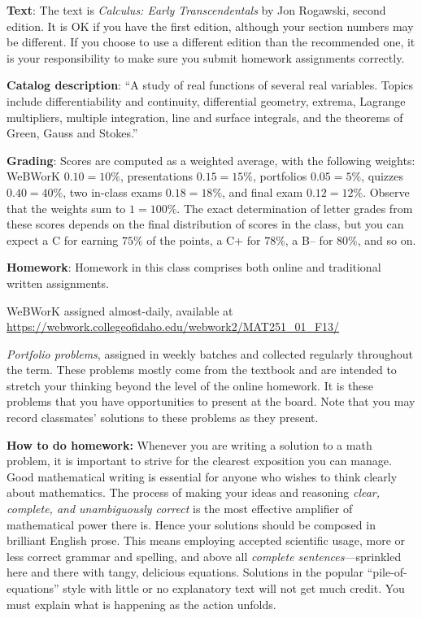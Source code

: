 \documentclass[12pt,twoside]{amsart}
\begin{document}
\textbf{Text}: The text is \emph{Calculus: Early Transcendentals} by Jon Rogawski, second edition. It is OK if you have the first edition, although your section numbers may be different. If you choose to use a different edition than the recommended one, it is your responsibility to make sure you submit homework assignments correctly. 

\textbf{Catalog description}: ``A study of real functions of several real variables. Topics include differentiability and continuity, differential geometry, extrema, Lagrange multipliers, multiple integration, line and surface integrals, and the theorems of Green, Gauss and Stokes.''

\textbf{Grading}: Scores are computed as a weighted average, with the following weights: WeBWorK $0.10 = 10\%$, presentations $0.15 = 15\%$, portfolios $0.05 = 5\%$, quizzes $0.40 = 40\%$, two in-class exams $0.18 = 18\%$, and final exam $0.12 = 12\%$. Observe that the weights sum to $1 = 100\%$. The exact determination of letter grades from these scores depends on the final distribution of scores in the class, but you can expect a C for earning $75\%$ of the points, a C+ for $78\%$, a B-- for $80\%$, and so on.

\textbf{Homework}: Homework in this class comprises both online and traditional written assignments.
\begin{compactitem}
    \item WeBWorK assigned almost-daily, available at \\
    \url{https://webwork.collegeofidaho.edu/webwork2/MAT251_01_F13/}
    \item \emph{Portfolio problems}, assigned in weekly batches and collected regularly throughout the term. These problems mostly come from the textbook and are intended to stretch your thinking beyond the level of the online homework. It is these problems that you have opportunities to present at the board. Note that you may record classmates' solutions to these problems as they present.
\end{compactitem}

\textbf{How to do homework:} Whenever you are writing a solution to a math problem, it is important to strive for the clearest exposition you can manage. Good mathematical writing is essential for anyone who wishes to think clearly about mathematics. The process of making your ideas and reasoning \emph{clear, complete, and unambiguously correct} is the most effective amplifier of mathematical power there is. Hence your solutions should be composed in brilliant English prose. This means employing accepted scientific usage, more or less correct grammar and spelling, and above all \emph{complete sentences}---sprinkled here and there with tangy, delicious equations. Solutions in the popular ``pile-of-equations'' style with little or no explanatory text will not get much credit. You must explain what is happening as the action unfolds. 
\end{document}
